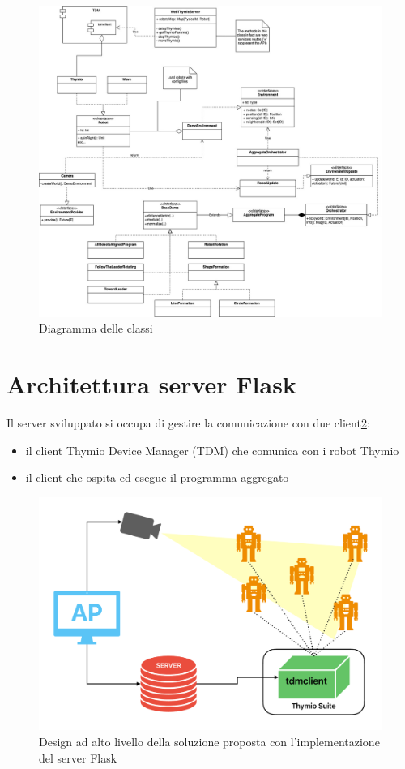 \documentclass[12pt,a4paper,openright,twoside]{book}
\begin{document}
\begin{figure}
    \centering
    \includegraphics[width=.99\linewidth]{figures/classi.jpg}
    \caption{Diagramma delle classi}
    \label{fig:classi}
\end{figure}

\section{Architettura server Flask}

Il server sviluppato si occupa di gestire la comunicazione con due client\cref{fig:server-arc}:
\begin{itemize}
    \item il client Thymio Device Manager (TDM) che comunica con i robot Thymio
    \item il client che ospita ed esegue il programma aggregato
\end{itemize}

\begin{figure}
    \centering
    \includegraphics[width=.8\linewidth]{figures/server-arc.pdf}
    \caption{Design ad alto livello della soluzione proposta con l'implementazione del server Flask}
    \label{fig:server-arc}
\end{figure}
\end{document}

